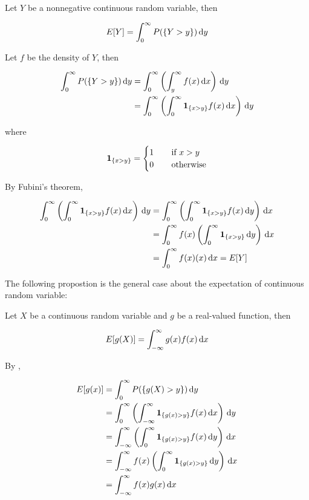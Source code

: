 \documentclass[a4paper,12pt]{article}
\begin{document}
\begin{pst}
  Let $Y$ be a nonnegative continuous random variable, then

  $$E[Y]=\int_{0}^{\infty}P(\left\{ Y>y\right\})\,\mathrm{d} y$$\s

  \prf Let $f$ be the density of $Y$, then

  $$\begin{aligned}[t]
    \int_{0}^{\infty}P(\left\{ Y>y\right\})\,\mathrm{d} y&=\int_{0}^{\infty}\left( \int_{y}^{\infty}f(x)\,\mathrm{d} x\right)\,\mathrm{d} y\\
    &=\int_{0}^{\infty}\left( \int_{0}^{\infty}\mathbf{1}_{\left\{ x>y\right\}}f(x)\,\mathrm{d} x\right)\,\mathrm{d} y
  \end{aligned}$$\s

  where

  $$\mathbf{1}_{\left\{ x>y\right\}}=\begin{cases}
    1&\;\;\;\;\text{if }x>y\\
    0&\;\;\;\;\text{otherwise}
  \end{cases}$$\s

  By Fubini's theorem,

  $$\begin{aligned}[t]
    \int_{0}^{\infty}\left( \int_{0}^{\infty}\mathbf{1}_{\left\{ x>y\right\}}f(x)\,\mathrm{d} x\right)\,\mathrm{d} y&=\int_{0}^{\infty}\left( \int_{0}^{\infty}\mathbf{1}_{\left\{ x>y\right\}}f(x)\,\mathrm{d} y\right)\,\mathrm{d} x\\
    &=\int_{0}^{\infty}f(x)\left( \int_{0}^{\infty}\mathbf{1}_{\left\{ x>y\right\}}\,\mathrm{d} y\right)\,\mathrm{d} x\\
    &=\int_{0}^{\infty}f(x)(x)\,\mathrm{d} x=E[Y]
  \end{aligned}$$
\end{pst}\n

The following propostion is the general case about the expectation of continuous random variable:\n

\begin{pst}
  Let $X$ be a continuous random variable and $g$ be a real-valued function, then

  $$E[g(X)]=\int_{-\infty}^{\infty}g(x)f(x)\,\mathrm{d} x$$\s

  \prf By \rpst[\sctd{1}],

  $$\begin{aligned}
    E[g(x)]&=\int_{0}^{\infty}P(\left\{ g(X)>y\right\})\,\mathrm{d} y\\
    &=\int_{0}^{\infty}\left( \int_{-\infty}^{\infty}\mathbf{1}_{\left\{ g(x)>y\right\}}f(x)\,\mathrm{d} x\right)\,\mathrm{d} y\\
    &=\int_{-\infty}^{\infty}\left( \int_{0}^{\infty}\mathbf{1}_{\left\{ g(x)>y\right\}}f(x)\,\mathrm{d} y\right)\,\mathrm{d} x\\
    &=\int_{-\infty}^{\infty}f(x)\left( \int_{0}^{\infty}\mathbf{1}_{\left\{ g(x)>y\right\}}\,\mathrm{d} y\right)\,\mathrm{d} x\\
    &=\int_{-\infty}^{\infty}f(x)g(x)\,\mathrm{d} x
  \end{aligned}$$
\end{pst}\n
\end{document}
